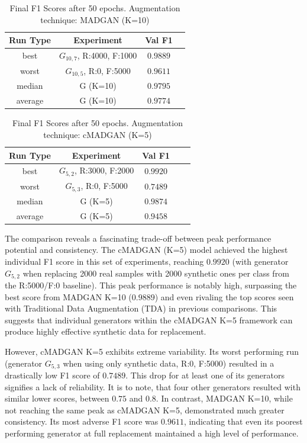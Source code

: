 \begin{table}[H]
	\vspace{-1.5em}
	\centering
	\begin{tabular}{|c|c|c|c|}
		\hline
		Run Type & Experiment & Val F1 \\ \hline
		best & \(G_{10, 7}\), R:4000, F:1000 & $0.9889$\\ \hline
		worst & \(G_{10, 5}\), R:0, F:5000 & $0.9611$\\ \hline
		median & G (K=10) & $0.9795$\\ \hline
		average & G (K=10) & $0.9774$
		\\ \hline
	\end{tabular}
    \caption{Final F1 Scores after 50 epochs. Augmentation technique: MADGAN (K=10)}
        \label{tab:res_replacement_mnist_cmadgan_vs_madgan__madgan}
\end{table}
\begin{table}[H]
	\centering
	\vspace{-1.5em}
	\begin{tabular}{|c|c|c|c|c|}
		\hline
		Run Type & Experiment & Val F1 \\ \hline
		best & \(G_{5, 2}\), R:3000, F:2000 & $0.9920$\\ \hline
		worst & \(G_{5, 3}\), R:0, F:5000 & $0.7489$\\ \hline
		median & G (K=5) & $0.9874$\\ \hline
		average & G (K=5) & $0.9458$
		\\ \hline
	\end{tabular}
    \caption{Final F1 Scores after 50 epochs. Augmentation technique: cMADGAN (K=5)}
        \label{tab:res_replacement_mnist_cmadgan_vs_madgan__cmadgan}
\end{table}
The comparison reveals a fascinating trade-off between peak performance potential and consistency. The cMADGAN (K=5) model achieved the highest individual F1 score in this set of experiments, reaching $0.9920$ (with generator \(G_{5,2}\) when replacing 2000 real samples with 2000 synthetic ones per class from the R:5000/F:0 baseline). This peak performance is notably high, surpassing the best score from MADGAN K=10 ($0.9889$) and even rivaling the top scores seen with Traditional Data Augmentation (TDA) in previous comparisons. This suggests that individual generators within the cMADGAN K=5 framework can produce highly effective synthetic data for replacement.

However, cMADGAN K=5 exhibits extreme variability. Its worst performing run (generator \(G_{5,3}\) when using only synthetic data, R:0, F:5000) resulted in a drastically low F1 score of $0.7489$. This drop for at least one of its generators signifies a lack of reliability. It is to note, that four other generators resulted with similar lower scores, between $0.75$ and $0.8$. In contrast, MADGAN K=10, while not reaching the same peak as cMADGAN K=5, demonstrated much greater consistency. Its most adverse F1 score was $0.9611$, indicating that even its poorest performing generator at full replacement maintained a high level of performance.

